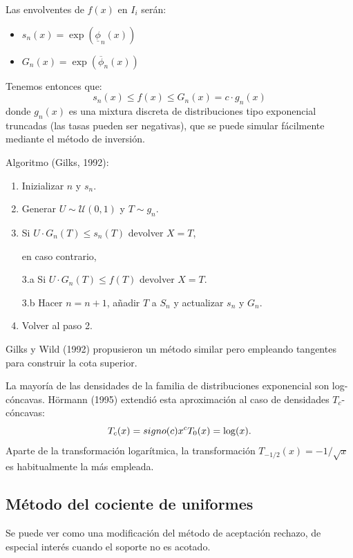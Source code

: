 \documentclass[]{book}
\theoremstyle{definition}
\theoremstyle{definition}
\theoremstyle{definition}
\theoremstyle{remark}
\begin{document}
Las envolventes de \(f\left( x\right)\) en \(I_{i}\) serán:

\begin{itemize}
\item
  \(s_n(x)=\exp \left( \underline{\phi}_n(x)\right)\)
\item
  \(G_n(x)=\exp \left( \overline{\phi}_n(x)\right)\)
\end{itemize}

Tenemos entonces que:
\[s_n(x)\leq f\left( x\right) \leq G_n(x)=c\cdot g_n(x)\] donde
\(g_n(x)\) es una mixtura discreta de distribuciones tipo exponencial
truncadas (las tasas pueden ser negativas), que se puede simular
fácilmente mediante el método de inversión.

Algoritmo (Gilks, 1992):

\begin{enumerate}
\def\labelenumi{\arabic{enumi}.}
\item
  Inizializar \(n\) y \(s_n\).
\item
  Generar \(U\sim \mathcal{U}\left( 0,1\right)\) y \(T\sim g_n\).
\item
  Si \(U\cdot G_n\left( T\right) \leq s_n\left( T\right)\) devolver
  \(X=T\),

  en caso contrario,

  3.a Si \(U\cdot G_n\left( T\right) \leq f\left( T\right)\) devolver
  \(X=T\).

  3.b Hacer \(n=n+1\), añadir \(T\) a \(S_n\) y actualizar \(s_n\) y
  \(G_n\).
\item
  Volver al paso 2.
\end{enumerate}

Gilks y Wild (1992) propusieron un método similar pero empleando
tangentes para construir la cota superior.

La mayoría de las densidades de la familia de distribuciones exponencial
son log-cóncavas. Hörmann (1995) extendió esta aproximación al caso de
densidades \(T_{c}\)-cóncavas: \[T_{c}(x) = signo(c)x^{c} \\
T_{0}(x) = \log (x).\] Aparte de la transformación logarítmica, la
transformación \(T_{-1/2}(x)=-1/\sqrt{x}\) es habitualmente la más
empleada.

\subsection{Método del cociente de
uniformes}\label{metodo-del-cociente-de-uniformes}

Se puede ver como una modificación del método de aceptación rechazo, de
especial interés cuando el soporte no es acotado.
\end{document}

